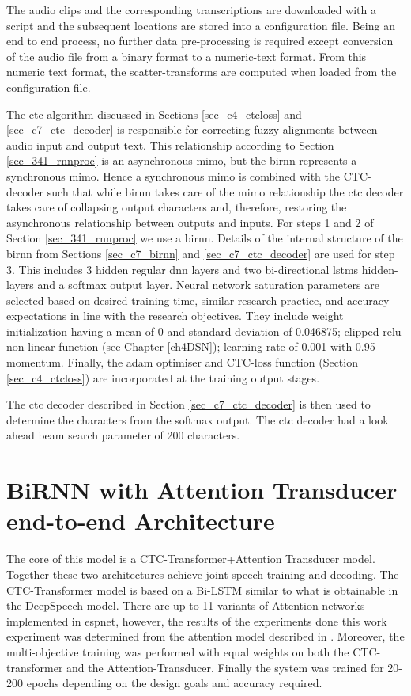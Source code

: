 {The audio clips and the corresponding transcriptions are downloaded with a script and the subsequent locations are stored into a configuration file. Being an end to end process, no further data pre-processing is required except conversion of the audio file from a binary format to a numeric-text format.  From this numeric text format, the scatter-transforms are computed when loaded from the configuration file.  

The \acrshort{ctc}-algorithm discussed in Sections \ref{sec_c4_ctcloss} and \ref{sec_c7_ctc_decoder} is responsible for correcting fuzzy alignments between audio input and output text.  This relationship according to Section \ref{sec_341_rnnproc} is an asynchronous \acrshort{mimo}, but the \acrshort{birnn} represents a synchronous \acrshort{mimo}. Hence a synchronous \acrshort{mimo} is combined with the CTC-decoder such that while \acrshort{birnn} takes care of the \acrlong{mimo} relationship the \acrshort{ctc} decoder takes care of collapsing output characters and, therefore, restoring the asynchronous relationship between outputs and inputs.  For steps 1 and 2 of Section \ref{sec_341_rnnproc} we use a \acrshort{birnn}.  Details of the internal structure of the \acrshort{birnn} from Sections \ref{sec_c7_birnn} and \ref{sec_c7_ctc_decoder} are used for step 3.  This includes 3 hidden regular \acrshort{dnn} layers and two bi-directional \acrshort{lstm}s hidden-layers and a softmax output layer.  Neural network saturation parameters are selected based on desired training time, similar research practice, and accuracy expectations in line with the research objectives. They include weight initialization having a mean of 0 and standard deviation of 0.046875; clipped \acrshort{relu} non-linear function (see Chapter \ref{ch4DSN}); learning rate of 0.001 with 0.95 momentum.  Finally, the adam optimiser and CTC-loss function (Section \ref{sec_c4_ctcloss}) are incorporated at the training output stages.

The \acrshort{ctc} decoder described in Section \ref{sec_c7_ctc_decoder} is then used to determine the characters from the softmax output.  The \acrshort{ctc} decoder had a look ahead beam search parameter of 200 characters.

\section{BiRNN with Attention Transducer end-to-end Architecture}\label{sec_7_5_blstm_t}

The core of this model is a CTC-Transformer+Attention Transducer model.  Together these two architectures achieve joint speech training and decoding.  The CTC-Transformer model is based on a Bi-LSTM similar to what is obtainable in the DeepSpeech model. There are up to 11 variants of Attention networks implemented in \acrshort{espnet}, however, the results of the experiments done this work experiment was determined from the attention model described in \cite{chorowski2015attention}.  Moreover, the multi-objective training was performed with equal weights on both the CTC-transformer and the Attention-Transducer.  Finally the system was trained for 20-200 epochs depending on the design goals and accuracy required.

}
